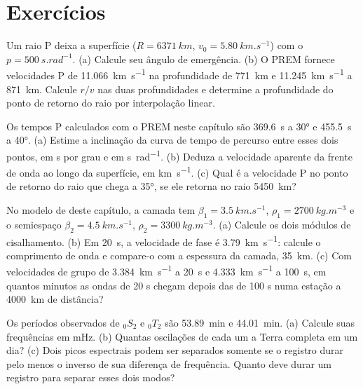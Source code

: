 \section{Exercícios}

\begin{exercise}[$\star$]\label{exo:b3:seismology-imaging:1}
Um raio P deixa a superfície ($R = \qty{6371}{km}$, $v_0 = \qty{5.80}{km.s^{-1}}$)
com o  $p = \qty{500}{s.rad^{-1}}$. (a) Calcule seu ângulo de
emergência. (b) O PREM fornece velocidades P de \qty{11.066}{km.s^{-1}} na profundidade de \qty{771}{km}
e \qty{11.245}{km.s^{-1}} a \qty{871}{km}. Calcule $r/v$ nas duas profundidades e
determine a profundidade do ponto de retorno do raio por interpolação linear.
\end{exercise}

\begin{exercise}[$\star$]\label{exo:b3:seismology-imaging:2}
Os tempos P calculados com o PREM neste capítulo são \qty{369.6}{s} a \ang{30}
e \qty{455.5}{s} a \ang{40}. (a) Estime a inclinação da curva de tempo de percurso
entre esses dois pontos, em \unit{s} por grau e em \unit{s.rad^{-1}}. (b) Deduza
a velocidade aparente da frente de onda ao longo da superfície, em
\unit{km.s^{-1}}. (c) Qual é a velocidade P no ponto de retorno do raio
que chega a \ang{35}, se ele retorna no raio \qty{5450}{km}?
\end{exercise}

\begin{exercise}[$\star$]\label{exo:b3:seismology-imaging:3}
No modelo de  deste capítulo, a camada tem $\beta_1 =
\qty{3.5}{km.s^{-1}}$, $\rho_1 = \qty{2700}{kg.m^{-3}}$ e o semiespaço
$\beta_2 = \qty{4.5}{km.s^{-1}}$, $\rho_2 = \qty{3300}{kg.m^{-3}}$.
(a) Calcule os dois módulos de cisalhamento. (b) Em \qty{20}{s}, a velocidade de fase é
\qty{3.79}{km.s^{-1}}: calcule o comprimento de onda e compare-o com a espessura da
camada, \qty{35}{km}. (c) Com velocidades de grupo de \qty{3.384}{km.s^{-1}} a
\qty{20}{s} e \qty{4.333}{km.s^{-1}} a \qty{100}{s}, em quantos minutos
as ondas de 20 s chegam depois das de 100 s numa estação a \qty{4000}{km} de distância?
\end{exercise}

\begin{exercise}[$\star$]\label{exo:b3:seismology-imaging:4}
Os períodos observados de ${}_0S_2$ e ${}_0T_2$ são \qty{53.89}{min} e
\qty{44.01}{min}. (a) Calcule suas frequências em \unit{mHz}. (b) Quantas
oscilações de cada um a Terra completa em um dia? (c) Dois picos espectrais
podem ser separados somente se o registro durar pelo menos o inverso de sua
diferença de frequência. Quanto deve durar um registro para separar esses dois modos?
\end{exercise}

